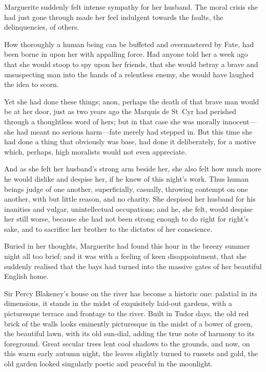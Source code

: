 Marguerite suddenly felt intense sympathy for her husband. The moral crisis she had just gone through made her feel indulgent towards the faults, the delinquencies, of others.

How thoroughly a human being can be buffeted and overmastered by Fate, had been borne in upon her with appalling force. Had anyone told her a week ago that she would stoop to spy upon her friends, that she would betray a brave and unsuspecting man into the hands of a relentless enemy, she would have laughed the idea to scorn.

Yet she had done these things; anon, perhaps the death of that brave man would be at her door, just as two years ago the Marquis de St~Cyr had perished through a thoughtless word of hers; but in that case she was morally innocent---she had meant no serious harm---fate merely had stepped in. But this time she had done a thing that obviously was base, had done it deliberately, for a motive which, perhaps, high moralists would not even appreciate.

And as she felt her husband's strong arm beside her, she also felt how much more he would dislike and despise her, if he knew of this night's work. Thus human beings judge of one another, superficially, casually, throwing contempt on one another, with but little reason, and no charity. She despised her husband for his inanities and vulgar, unintellectual occupations; and he, she felt, would despise her still worse, because she had not been strong enough to do right for right's sake, and to sacrifice her brother to the dictates of her conscience.

Buried in her thoughts, Marguerite had found this hour in the breezy summer night all too brief; and it was with a feeling of keen disappointment, that she suddenly realised that the bays had turned into the massive gates of her beautiful English home.

Sir Percy Blakeney's house on the river has become a historic one: palatial in its dimensions, it stands in the midst of exquisitely laid-out gardens, with a picturesque terrace and frontage to the river. Built in Tudor days, the old red brick of the walls looks eminently picturesque in the midst of a bower of green, the beautiful lawn, with its old sun-dial, adding the true note of harmony to its foreground. Great secular trees lent cool shadows to the grounds, and now, on this warm early autumn night, the leaves slightly turned to russets and gold, the old garden looked singularly poetic and peaceful in the moonlight.

